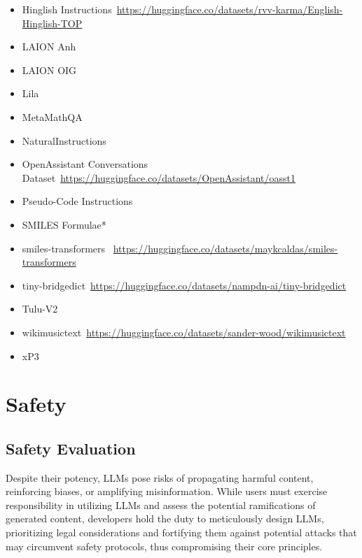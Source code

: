 \begin{itemize}
\begin{itemize}
    \item Hinglish Instructions~{\tiny\url{https://huggingface.co/datasets/rvv-karma/English-Hinglish-TOP}}
    \item LAION Anh
    \item LAION OIG
    \item Lila~\citep{mishra2023lila}
    \item MetaMathQA~\citep{yu2023metamath}
    \item NaturalInstructions~\citep{naturalinstructions}
    \item OpenAssistant Conversations Dataset~{\tiny\url{https://huggingface.co/datasets/OpenAssistant/oasst1}}

    \item Pseudo-Code Instructions~\citep{mishra2023prompting}
    \item SMILES Formulae*
    \item smiles-transformers~{
    \tiny\url{https://huggingface.co/datasets/maykcaldas/smiles-transformers}
    }
    \item tiny-bridgedict~{\tiny\url{https://huggingface.co/datasets/nampdn-ai/tiny-bridgedict}}
    \item Tulu-V2~\citep{ivison2023camels}
    \item wikimusictext~{\tiny\url{https://huggingface.co/datasets/sander-wood/wikimusictext}}
    \item xP3~\citep{muennighoff2022crosslingual}
    \end{itemize}
\end{itemize}


\section{Safety}
\label{ap:safety}
\subsection{Safety Evaluation}
Despite their potency, LLMs pose risks of propagating harmful content, reinforcing biases, or amplifying misinformation. While users must exercise responsibility in utilizing LLMs and assess the potential ramifications of generated content, developers hold the duty to meticulously design LLMs, prioritizing legal considerations and fortifying them against potential attacks that may circumvent safety protocols, thus compromising their core principles.

